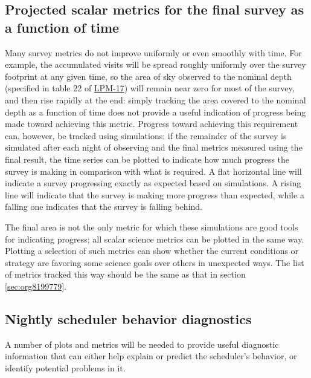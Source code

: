 \subsection{Projected scalar metrics for the final survey as a function of time}
\label{sec:org793b790}
Many survey metrics do not improve uniformly or even smoothly with time.
For example, the accumulated visits will be spread roughly uniformly over the survey footprint at any given time, so the area of sky observed to the nominal depth (specified in table 22 of \href{http://ls.st/lpm-17}{LPM-17}) will remain near zero for most of the survey, and then rise rapidly at the end: simply tracking the area covered to the nominal depth as a function of time does not provide a useful indication of progress being made toward achieving this metric.
Progress toward achieving this requirement can, however, be tracked using simulations: if the remainder of the survey is simulated after each night of observing and the final metrics measured using the final result, the time series can be plotted to indicate how much progress the survey is making in comparison with what is required.
A flat horizontal line will indicate a survey progressing exactly as expected based on simulations.
A rising line will indicate that the survey is making more progress than expected, while a falling one indicates that the survey is falling behind.

The final area is not the only metric for which these simulations are good tools for indicating progress; all scalar science metrics can be plotted in the same way. Plotting a selection of such metrics can show whether the current conditions or strategy are favoring some science goals over others in unexpected ways.
The list of metrics tracked this way should be the same as that in section \ref{sec:org8199779}.

\subsection{Nightly scheduler behavior diagnostics}
\label{sec:orgc5a95f0}
A number of plots and metrics will be needed to provide useful diagnostic information that can either help explain or predict the scheduler's behavior, or identify potential problems in it.

